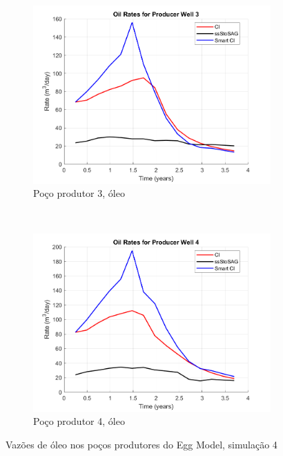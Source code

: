 \begin{figure}[!ht]
	\begin{subfigure}[b]{.45\textwidth}
		\includegraphics[width=\textwidth]{figs/resultadosEgg/imgsim4/EGG_OilWell3_Zoom}
		\caption{Po\c{c}o produtor 3, \'{o}leo}
		\label{EGG4_OilWell3}
	\end{subfigure}
	~
	\begin{subfigure}[b]{.45\textwidth}
		\includegraphics[width=\textwidth]{figs/resultadosEgg/imgsim4/EGG_OilWell4_Zoom}
		\caption{Po\c{c}o produtor 4, \'{o}leo}
		\label{EGG4_OilWell4}
	\end{subfigure}
	\caption{Vaz\~{o}es de \'{o}leo nos po\c{c}os produtores do Egg Model, simula\c{c}\~{a}o 4}
	\label{EGG4_OilRates}
\end{figure}


